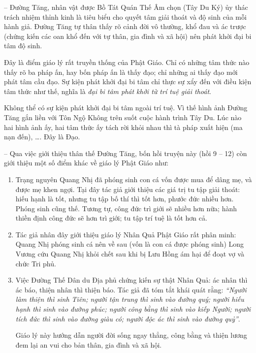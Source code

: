 -- Đường Tăng, nhân vật được Bồ Tát Quán Thế Âm chọn (Tây Du Ký) ủy thác trách nhiệm thỉnh kinh là tiêu biểu cho quyết tâm giải thoát và độ sinh của mỗi hành giả. Đường Tăng tự thân thấy rõ cảnh đời vô thường, khổ đau và ác trược (chứng kiến các oan khổ đến với tự thân, gia đình và xã hội) nên phát khởi đại bi tâm độ sinh.

Đây là điểm giáo lý rất truyền thống của Phật Giáo. Chỉ có những tâm thức nào thấy rõ ba pháp ấn, hay bốn pháp ấn là thấy đạo; chỉ những ai thấy đạo mới phát tâm cầu đạo. Sự kiện phát khởi đại bi tâm chỉ thực sự xẩy đến với điều kiện tâm thức như thế, nghĩa là \emph{đại bi tâm phát khởi từ trí tuệ giải thoát}.

Không thể có sự kiện phát khởi đại bi tâm ngoài trí tuệ. Vì thế hình ảnh Đường Tăng gắn liền với Tôn Ngộ Không trên suốt cuộc hành trình Tây Du. Lúc nào hai hình ảnh ấy, hai tâm thức ấy tách rời khỏi nhau thì tà pháp xuất hiện (ma nạn đến), \ldots. Đây là Đạo.

-- Qua việc giới thiệu thân thế Đường Tăng, bốn hồi truyện này (hồi 9 -- 12) còn giới thiệu một số điểm khác về giáo lý Phật Giáo như:

\begin{enumerate}[label=\itshape\alph*\upshape/]

    \item Trạng nguyên Quang Nhị đã phóng sinh con cá vốn được mua để dâng mẹ, và được mẹ khen ngợi. Tại đây tác giả giới thiệu các giá trị tu tập giải thoát: hiếu hạnh là tốt, nhưng tu tập bố thí thì tốt hơn, phước đức nhiều hơn. Phóng sinh cũng thế. Tương tự, công đức trì giới sẽ nhiều hơn nữa; hành thiền định công đức sẽ hơn trì giới; tu tập trí tuệ là tốt hơn cả.

    \item Tác giả nhân đây giới thiệu giáo lý Nhân Quả Phật Giáo rất phân minh: Quang Nhị phóng sinh cá nên về sau (vốn là con cá được phóng sinh) Long Vương cứu Quang Nhị khỏi chết sau khi bị Lưu Hồng ám hại để đoạt vợ và chức Tri phủ.

    \item Việc Đường Thế Dân du Địa phủ chứng kiến sự thật Nhân Quả: ác nhân thì ác báo, thiện nhân thì thiện báo. Tác giả đã tóm tắt khái quát rằng: \emph{``Người làm thiện thì sinh Tiên; người tận trung thì sinh vào đường quý; người hiếu hạnh thì sinh vào đường phúc; người công bằng thì sinh vào kiếp Người; người tích đức thì sinh vào đường giàu có; người độc ác thì sinh vào đường quỷ''}.

    Giáo lý này hướng dẫn người đời sống ngay thẳng, công bằng và thiện lương đem lại an vui cho bản thân, gia đình và xã hội.
\end{enumerate}

